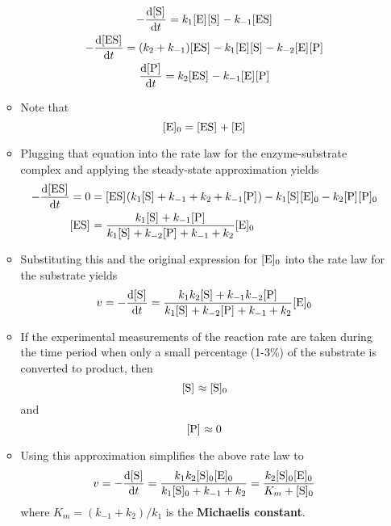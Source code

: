 \documentclass[../notes.tex]{subfiles}
\begin{document}
\begin{itemize}
\begin{itemize}
\begin{gather*}
            -\dv{\cnc{S}}{t} = k_1\cnc{E}\cnc{S}-k_{-1}\cnc{ES}\\
            -\dv{\cnc{ES}}{t} = (k_2+k_{-1})\cnc{ES}-k_1\cnc{E}\cnc{S}-k_{-2}\cnc{E}\cnc{P}\\
            \dv{\cnc{P}}{t} = k_2\cnc{ES}-k_{-1}\cnc{E}\cnc{P}
        \end{gather*}
        \item Note that
        \begin{equation*}
            \cnc[0]{E} = \cnc{ES}+\cnc{E}
        \end{equation*}
        \item Plugging that equation into the rate law for the enzyme-substrate complex and applying the steady-state approximation yields
        \begin{align*}
            -\dv{\cnc{ES}}{t} = 0 &= \cnc{ES}(k_1\cnc{S}+k_{-1}+k_2+k_{-1}\cnc{P})-k_1\cnc{S}\cnc[0]{E}-k_2\cnc{P}\cnc[0]{P}\\
            \cnc{ES} &= \frac{k_1\cnc{S}+k_{-1}\cnc{P}}{k_1\cnc{S}+k_{-2}\cnc{P}+k_{-1}+k_2}\cnc[0]{E}
        \end{align*}
        \item Substituting this and the original expression for $\cnc[0]{E}$ into the rate law for the substrate yields
        \begin{equation*}
            v = -\dv{\cnc{S}}{t}
            = \frac{k_1k_2\cnc{S}+k_{-1}k_{-2}\cnc{P}}{k_1\cnc{S}+k_{-2}\cnc{P}+k_{-1}+k_2}\cnc[0]{E}
        \end{equation*}
        \item If the experimental measurements of the reaction rate are taken during the time period when only a small percentage (1-3\%) of the substrate is converted to product, then
        \begin{equation*}
            \cnc{S} \approx \cnc[0]{S}
        \end{equation*}
        and
        \begin{equation*}
            \cnc{P} \approx 0
        \end{equation*}
        \item Using this approximation simplifies the above rate law to
        \begin{equation*}
            v = -\dv{\cnc{S}}{t}
            = \frac{k_1k_2\cnc[0]{S}\cnc[0]{E}}{k_1\cnc[0]{S}+k_{-1}+k_2}
            = \frac{k_2\cnc[0]{S}\cnc[0]{E}}{K_m+\cnc[0]{S}}
        \end{equation*}
        where $K_m=(k_{-1}+k_2)/k_1$ is the \textbf{Michaelis constant}.

\end{itemize}
\end{itemize}
\end{document}
